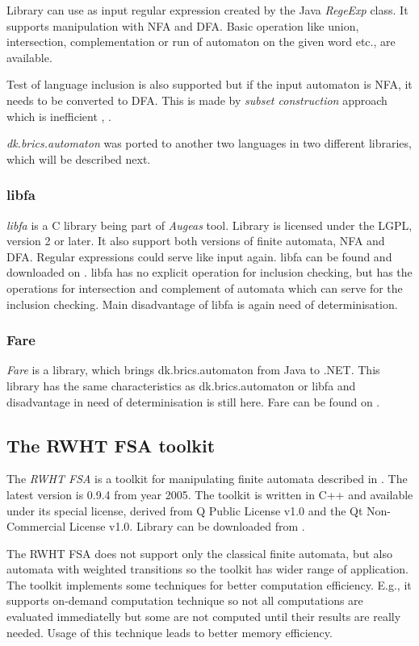 Library can use as input regular expression created by the Java \emph{RegeExp} class.
It supports manipulation with NFA and DFA. Basic operation like union,
intersection, complementation or run of automaton on the given word etc., are available.

Test of language inclusion is also supported but if the input automaton is NFA, it needs to be converted to DFA. 
This is made by \emph{subset construction} approach which is inefficient \cite{cav06}, \cite{tacas10}.

\emph{dk.brics.automaton} was ported to another two languages in two different libraries, which will be described next.

\subsubsection{libfa}
\emph{libfa} is a C library being part of \emph{Augeas} tool. 
Library is licensed under the LGPL, version 2 or later. It also support both versions of finite automata, NFA and DFA. 
Regular expressions could serve like input again.
libfa can be found and downloaded on \cite{libfa}.
libfa has no explicit operation for inclusion checking, but has the operations for intersection and complement of automata
which can serve for the inclusion checking.
Main disadvantage of libfa is again need of determinisation.

\subsubsection{Fare}
\emph{Fare} is a library, which brings dk.brics.automaton from Java to .NET. 
This library has the same characteristics as dk.brics.automaton or libfa and disadvantage in need of determinisation is still here. 
Fare can be found on \cite{fare}.

\subsection{The RWHT FSA toolkit}
The \emph{RWHT FSA} is a toolkit for manipulating finite automata described in \cite{kanthakN04}. 
The latest version is 0.9.4 from year 2005. The toolkit is written in C++
and available under its special license, derived from Q Public License v1.0 and the Qt Non-Commercial License v1.0. Library can be downloaded from \cite{rwth}. 

The RWHT FSA does not support only the classical finite automata, but also automata with weighted transitions so the toolkit has wider range of application.
The toolkit implements some techniques for better computation efficiency. E.g., it supports on-demand computation technique 
so not all computations are evaluated immediatelly but some are not computed until their results are really
needed. Usage of this technique leads to better memory efficiency. 

